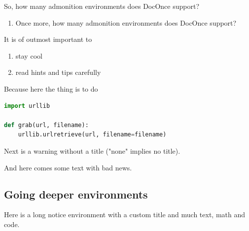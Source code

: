 \documentclass[%
oneside,                 %
final,                   %
10pt]{article}
\newenvironment{warningshaded}
{\def\FrameCommand{\fboxsep=3mm\colorbox{colors1_warning_background}}
 \MakeFramed {\advance\hsize-\width \FrameRestore}}{\endMakeFramed}
\newenvironment{warning_colors1admon}[1][Warning]{
\begin{warningshaded}
\noindent
\texttt{[image: latex\_figs/warning]}\ \ \   \textbf{#1}\\ \par
\vspace{-3mm}\nobreak\noindent\ignorespaces
}
{
\end{warningshaded}
}
\newenvironment{questionshaded}
{\def\FrameCommand{\fboxsep=3mm\colorbox{colors1_question_background}}
 \MakeFramed {\advance\hsize-\width \FrameRestore}}{\endMakeFramed}
\newenvironment{question_colors1admon}[1][Question]{
\begin{questionshaded}
\noindent
\texttt{[image: latex\_figs/question]}\ \ \   \textbf{#1}\\ \par
\vspace{-3mm}\nobreak\noindent\ignorespaces
}
{
\end{questionshaded}
}
\begin{document}
\begin{question_colors1admon}[Question]
So, how many admonition environments does DocOnce support?
\end{question_colors1admon} %



\begin{question_colors1admon}[Question]
\begin{enumerate}
 \item Once more, how many admonition environments does DocOnce support?
\end{enumerate}
\noindent
\end{question_colors1admon} %



\begin{warning_colors1admon}[Tip]
It is of outmost important to
\begin{enumerate}
\item stay cool
\item read hints and tips carefully
\end{enumerate}
\noindent
Because here the thing is to do
\begin{lstlisting}[language=Python,style=simple,xleftmargin=2mm]
import urllib

def grab(url, filename):
    urllib.urlretrieve(url, filename=filename)

\end{lstlisting}
\end{warning_colors1admon} %


Next is a warning without a title ("none" implies no title).

\begin{warning_colors1admon}[]
And here comes some text with bad news.
\end{warning_colors1admon} %


\subsection{Going deeper environments}
Here is a long notice environment with a custom title and much
text, math and code.
\end{document}
